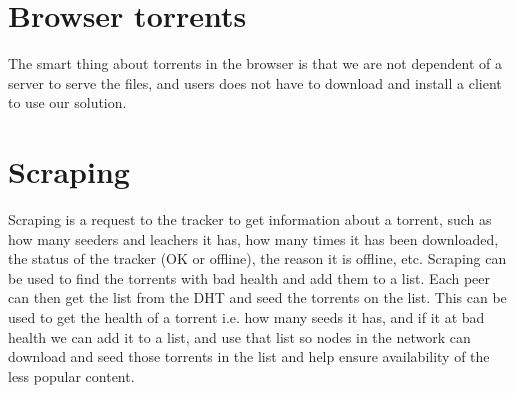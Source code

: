 



\section{Browser torrents}
The smart thing about torrents in the browser is that we are not dependent of a server to serve the files, and users does not have to download and install a client to use our solution.





\section{Scraping}
Scraping is a request to the tracker to get information about a torrent, such as how many seeders and leachers it has, how many times it has been downloaded, the status of the tracker (OK or offline), the reason it is offline, etc.
Scraping can be used to find the torrents with bad health and add them to a list. Each peer can then get the list from the \acs{DHT} and seed the torrents on the list.
This can be used to get the health of a torrent i.e. how many seeds it has, and if it at bad health we can add it to a list, and use that list so nodes in the network can download and seed those torrents in the list and help ensure availability of the less popular content.
